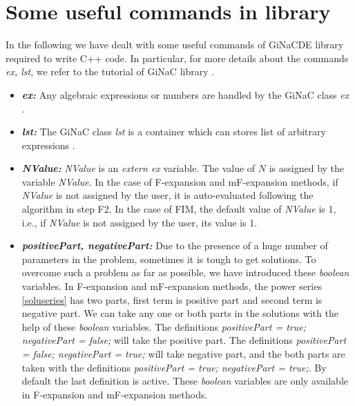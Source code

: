 \documentclass[prd,aps,floats,showkeys,nofootinbib,notitlepage]{revtex4}
\begin{document}
	\section{Some useful commands in library}\label{sec:command}
	In the following we have dealt with some useful commands of GiNaCDE library required to write C++ code. In particular, for more details about the commands {\em ex, lst}, we refer to the tutorial of GiNaC library \cite{ginac}.
	\begin{itemize}
		\item[] {\em \textbf{ex:}}  Any algebraic expressions or numbers are handled by the GiNaC class {\em ex} \cite{ginac}. 
		\item[] {\em \textbf{lst:}} The GiNaC class {\em lst} is a container  which can stores list of arbitrary expressions \cite{ginac}.
		\item[] {\em \textbf{NValue:}} {\em NValue} is an {\em extern ex} variable. The value of $N$ is assigned by the variable {\em NValue}. In the case of F-expansion and mF-expansion methods, if {\em NValue} is not assigned by the user, it is auto-evaluated following the algorithm in step F2. In the case of FIM, the default value of {\em NValue} is 1, i.e., if {\em NValue} is not assigned by the user, its value is 1.
		
		\item[] {\em \textbf{positivePart, negativePart:}} Due to the presence of a huge number of parameters in the problem, sometimes it is tough to get solutions. To overcome such a problem as far as possible, we have introduced these {\em boolean} variables. In F-expansion and mF-expansion methods, the power series \eqref{soluseries}
		has two parts, first term is positive part and second term is negative part. We can take any one or both parts in the solutions with the help of these {\em boolean} variables. The definitions {\em positivePart = true; negativePart = false;} will take the positive part. The definitions {\em positivePart = false; negativePart = true;} will take negative part, and the both parts are taken with the definitions {\em positivePart = true; negativePart = true;}. By default the last definition is active. These {\em boolean} variables are only available in F-expansion and mF-expansion methods. 
		

\end{itemize}
\end{document}
